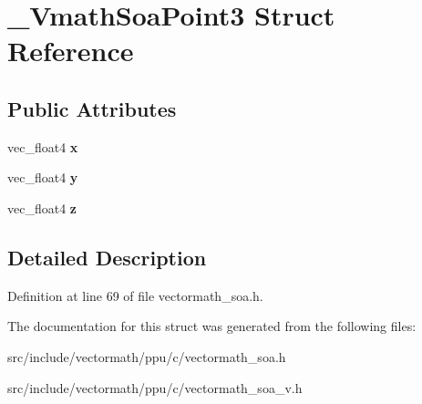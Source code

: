 \hypertarget{struct__VmathSoaPoint3}{\section{\-\_\-\-Vmath\-Soa\-Point3 Struct Reference}
\label{struct__VmathSoaPoint3}
}
\subsection*{Public Attributes}
\begin{DoxyCompactItemize}
\item 
\hypertarget{struct__VmathSoaPoint3_a6509eb3519d88fad0218c7c3a08dfa66}{vec\-\_\-float4 {\bfseries x}}\label{struct__VmathSoaPoint3_a6509eb3519d88fad0218c7c3a08dfa66}

\item 
\hypertarget{struct__VmathSoaPoint3_aae1a01365d039736edc4c14840b1bd00}{vec\-\_\-float4 {\bfseries y}}\label{struct__VmathSoaPoint3_aae1a01365d039736edc4c14840b1bd00}

\item 
\hypertarget{struct__VmathSoaPoint3_adbfc4dd8268a6556395942563d8277aa}{vec\-\_\-float4 {\bfseries z}}\label{struct__VmathSoaPoint3_adbfc4dd8268a6556395942563d8277aa}

\end{DoxyCompactItemize}


\subsection{Detailed Description}


Definition at line 69 of file vectormath\-\_\-soa.\-h.



The documentation for this struct was generated from the following files\-:\begin{DoxyCompactItemize}
\item 
src/include/vectormath/ppu/c/vectormath\-\_\-soa.\-h\item 
src/include/vectormath/ppu/c/vectormath\-\_\-soa\-\_\-v.\-h\end{DoxyCompactItemize}
